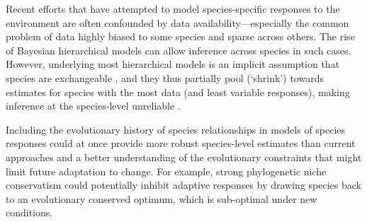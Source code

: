 \documentclass[11pt]{article}
\begin{document}
Recent efforts that have attempted to model species-specific responses to the environment \citep{diez2012forecasting} are often confounded by data availability---especially the common problem of data highly biased to some species and sparse across others. The rise of Bayesian hierarchical models can allow inference across species in such cases. However, underlying most hierarchical models is an implicit assumption that species are exchangeable \citep{gelman2006}, and they thus partially pool (`shrink') towards estimates for species with the most data (and least variable responses), making inference at the species-level unreliable \citep{ettinger2020}. 

Including the evolutionary history of species relationships in models of species responses could at once provide more robust species-level estimates than current approaches and a better understanding of the evolutionary constraints that might limit future adaptation to change. For example, strong phylogenetic niche conservatism \citep{wiens2010niche} could potentially inhibit adaptive responses by drawing species back to an evolutionary conserved optimum, which is sub-optimal under new conditions. 

 
\end{document}
